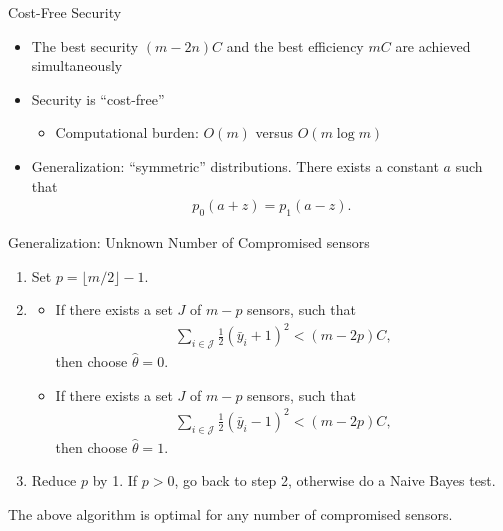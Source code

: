 \documentclass[10pt]{beamer}
\newcommand{\tikzdir}[1]{#1.tikz}
\newcommand{\inputtikz}[1]{}}
\begin{document}
\begin{frame}{Cost-Free Security}
  \begin{itemize}
  \item The best security $(m-2n)C$ and the best efficiency $mC$ are achieved simultaneously
  \item Security is ``cost-free''
    \begin{itemize}
    \item Computational burden: $O(m)$ versus $O(m\log m)$
    \end{itemize}
  \item Generalization: ``symmetric'' distributions. There exists a constant $a$ such that 
    \begin{align*}
      p_0(a+z) = p_1(a-z).
    \end{align*}
  \end{itemize}
\end{frame}

\begin{frame}{Generalization: Unknown Number of Compromised sensors}
  \begin{enumerate}
  \item Set $p = \lfloor m/2\rfloor -1$.
  \item 
    \begin{itemize}
    \item If there exists a set $J$ of $m-p$ sensors, such that
      \begin{align*}
        \sum_{i\in \mathcal J}\frac{1}{2}(\bar y_i+1)^2 < (m-2p)C,
      \end{align*}
      then choose $\hat \theta = 0$. 
    \item If there exists a set $J$ of $m-p$ sensors, such that
      \begin{align*}
        \sum_{i\in \mathcal J}\frac{1}{2}(\bar y_i-1)^2 < (m-2p)C,
      \end{align*}
      then choose $\hat \theta = 1$. 
    \end{itemize}
  \item Reduce $p$ by 1. If $p > 0$, go back to step 2, otherwise do a Naive Bayes test.
  \end{enumerate}
  The above algorithm is optimal for any number of compromised sensors.
\end{frame}

\end{document}
